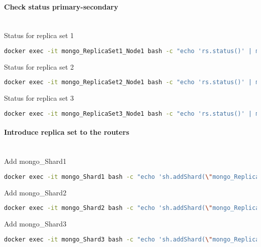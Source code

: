 \paragraph{Check status primary-secondary}\mbox{}\\
Status for replica set 1
\begin{lstlisting}[language=Bash, caption=Check status of replica set 1]
docker exec -it mongo_ReplicaSet1_Node1 bash -c "echo 'rs.status()' | mongosh"
\end{lstlisting}
Status for replica set 2
\begin{lstlisting}[language=Bash, caption=Check status of replica set 2]
docker exec -it mongo_ReplicaSet2_Node1 bash -c "echo 'rs.status()' | mongosh"
\end{lstlisting}
Status for replica set 3
\begin{lstlisting}[language=Bash, caption=Check status of replica set 3]
docker exec -it mongo_ReplicaSet3_Node1 bash -c "echo 'rs.status()' | mongosh"
\end{lstlisting}

\paragraph{Introduce replica set to the routers}\mbox{}\\
Add mongo{\_}Shard1
\begin{lstlisting}[language=Bash, caption=Introduce replica 1]
docker exec -it mongo_Shard1 bash -c "echo 'sh.addShard(\"mongo_ReplicaSet1/mongo_ReplicaSet1_Node1\")' | mongosh"
\end{lstlisting}
Add mongo{\_}Shard2
\begin{lstlisting}[language=Bash, caption=Introduce replica 2]
docker exec -it mongo_Shard2 bash -c "echo 'sh.addShard(\"mongo_ReplicaSet2/mongo_ReplicaSet2_Node1\")' | mongosh"
\end{lstlisting}
Add mongo{\_}Shard3
\begin{lstlisting}[language=Bash, caption=Introduce replica 3]
docker exec -it mongo_Shard3 bash -c "echo 'sh.addShard(\"mongo_ReplicaSet3/mongo_ReplicaSet3_Node1\")' | mongosh"
\end{lstlisting}

